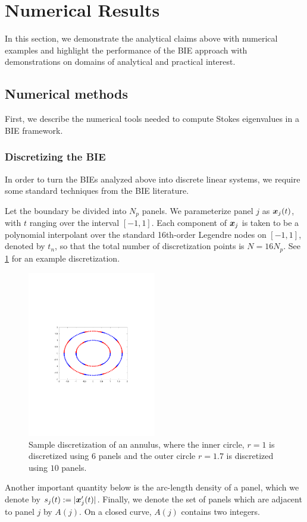 \section{Numerical Results}
\label{sec:numerical}

In this section, we demonstrate the analytical
claims above with numerical examples and
highlight the performance of the BIE approach
with demonstrations on domains of analytical
and practical interest.

\subsection{Numerical methods}

First, we describe the numerical tools needed
to compute Stokes eigenvalues in a BIE
framework.

\subsubsection{Discretizing the BIE}

In order to turn the BIEs analyzed
above into discrete linear systems,
we require some standard techniques
from the BIE literature.

Let the boundary be divided into $N_p$
panels.
%
We parameterize panel $j$ as
${\boldsymbol x}_j(t)$, with $t$ ranging over the
interval $[-1,1]$.
%
Each component of ${\boldsymbol x}_j$ is taken to be
a polynomial interpolant over the
standard 16th-order Legendre nodes on
$[-1,1]$, denoted by $t_n$, so that
the total number of discretization
points is $N=16N_p$.
%
See \cref{fig:panels} for an example
discretization.

\begin{figure}
\centering
\includegraphics[width=0.5\textwidth]{fig/annulus_discretization.pdf}
\caption{Sample discretization of an annulus, where the inner
circle, $r=1$ is discretized using $6$ panels and the outer circle $r=1.7$
is discretized using $10$ panels.}
\label{fig:panels}
\end{figure}
%
Another important quantity below is the
arc-length density of a panel, which
we denote by $s_j(t) := |{\boldsymbol x}'_j(t)|$.
%
Finally, we denote the set of panels
which are adjacent to panel $j$
by $A(j)$. On a closed curve,
$A(j)$ contains two integers.

